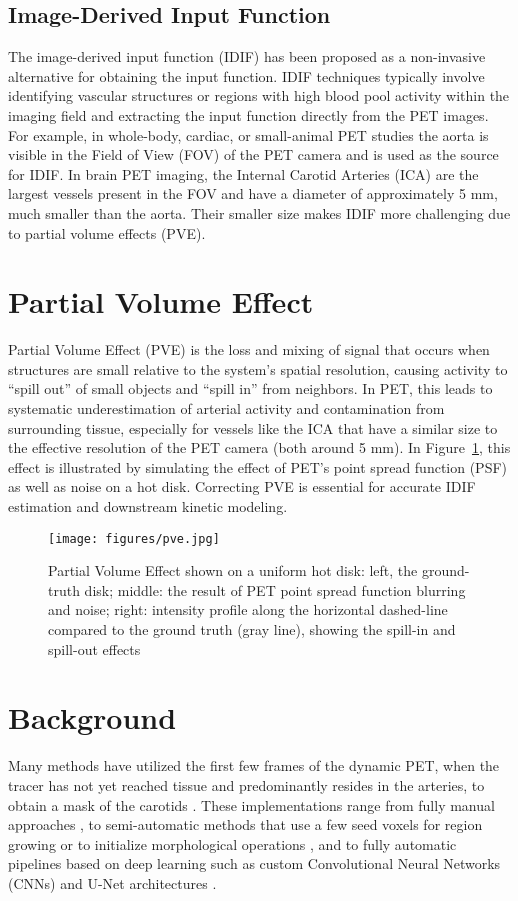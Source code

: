 \subsection{Image-Derived Input Function}
The image-derived input function (IDIF) has been proposed as a non-invasive alternative for obtaining the input function.
IDIF techniques typically involve identifying vascular structures or regions with high blood pool activity within the imaging field and extracting the input function directly from the PET images.
For example, in whole-body, cardiac, or small-animal PET studies the aorta is visible in the Field of View (FOV) of the PET camera and is used as the source for IDIF.
In brain PET imaging, the Internal Carotid Arteries (ICA) are the largest vessels present in the FOV and have a diameter of approximately 5 mm, much smaller than the aorta.
Their smaller size makes IDIF more challenging due to partial volume effects (PVE).

\section{Partial Volume Effect}\label{sec:pve}
Partial Volume Effect (PVE) is the loss and mixing of signal that occurs when structures are small relative to the system’s spatial resolution, causing activity to “spill out” of small objects and “spill in” from neighbors.
In PET, this leads to systematic underestimation of arterial activity and contamination from surrounding tissue, especially for vessels like the ICA that have a similar size to the effective resolution of the PET camera (both around 5 mm).
In Figure~\ref{fig:pve}, this effect is illustrated by simulating the effect of PET's point spread function (PSF) as well as noise on a hot disk.
Correcting PVE is essential for accurate IDIF estimation and downstream kinetic modeling.

\begin{figure}[h]
	\texttt{[image: figures/pve.jpg]}
	\caption{Partial Volume Effect shown on a uniform hot disk: left, the ground-truth disk; middle: the result of PET point spread function blurring and noise; right: intensity profile along the horizontal dashed-line compared to the ground truth (gray line), showing the spill-in and spill-out effects}
	\label{fig:pve}
\end{figure}
\section{Background}
Many methods have utilized the first few frames of the dynamic PET, when the tracer has not yet reached tissue and predominantly resides in the arteries, to obtain a mask of the carotids \cite{young2023image}.
These implementations range from fully manual approaches \cite{feng2015image}, to semi-automatic methods that use a few seed voxels for region growing or to initialize morphological operations \cite{dassanayake2022caliper,vestergaard2021validation}, and to fully automatic pipelines based on deep learning such as custom Convolutional Neural Networks (CNNs) \cite{ferrante2024physically,chen2025deep} and U-Net architectures \cite{chavan2024end}.

